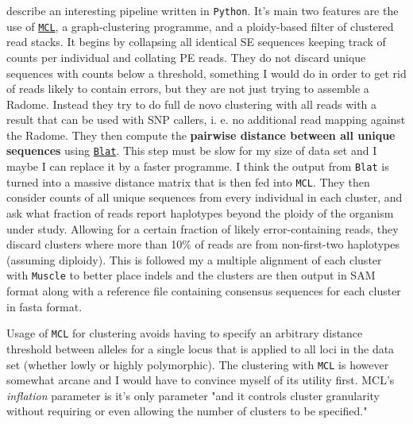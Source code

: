 \documentclass{article}\usepackage[]{graphicx}\usepackage[]{color}
\begin{document}
\cite{Peterson2012} describe an interesting pipeline written in \texttt{Python}. It's main two features are the use of \href{http://www.micans.org/mcl/}{\texttt{MCL}}, a graph-clustering programme, and a ploidy-based filter of clustered read stacks. It begins by collapsing all identical SE sequences keeping track of counts per individual and collating PE reads. They do not discard unique sequences with counts below a threshold, something I would do in order to get rid of reads likely to contain errors, but they are not just trying to assemble a Radome. Instead they try to do full de novo clustering with all reads with a result that can be used with SNP callers, i. e. no additional read mapping against the Radome. They then compute the \textbf{pairwise distance between all unique sequences} using \href{http://genome.ucsc.edu/goldenPath/help/blatSpec.html}{\texttt{Blat}}. This step must be slow for my size of data set and I maybe I can replace it by a faster programme. I think the output from \texttt{Blat} is turned into a massive distance matrix that is then fed into \texttt{MCL}. They then consider counts of all unique sequences from every individual in each cluster, and ask what fraction of reads report haplotypes beyond the ploidy of the organism under study. Allowing for a certain fraction of likely error-containing reads, they discard clusters where more than 10\% of reads are from non-first-two haplotypes (assuming diploidy). This is followed my a multiple alignment of each cluster with \texttt{Muscle} to better place indels and the clusters are then output in SAM format along with a reference file containing consensus sequences for each cluster in fasta format.

Usage of \texttt{MCL} for clustering avoids having to specify an arbitrary distance threshold between alleles for a single locus that is applied to all loci in the data set (whether lowly or highly polymorphic). The clustering with \texttt{MCL} is however somewhat arcane and I would have to convince myself of its utility first. MCL's \emph{inflation} parameter is it's only parameter "and it controls cluster granularity without requiring or even allowing the number of clusters to be specified."
\end{document}
